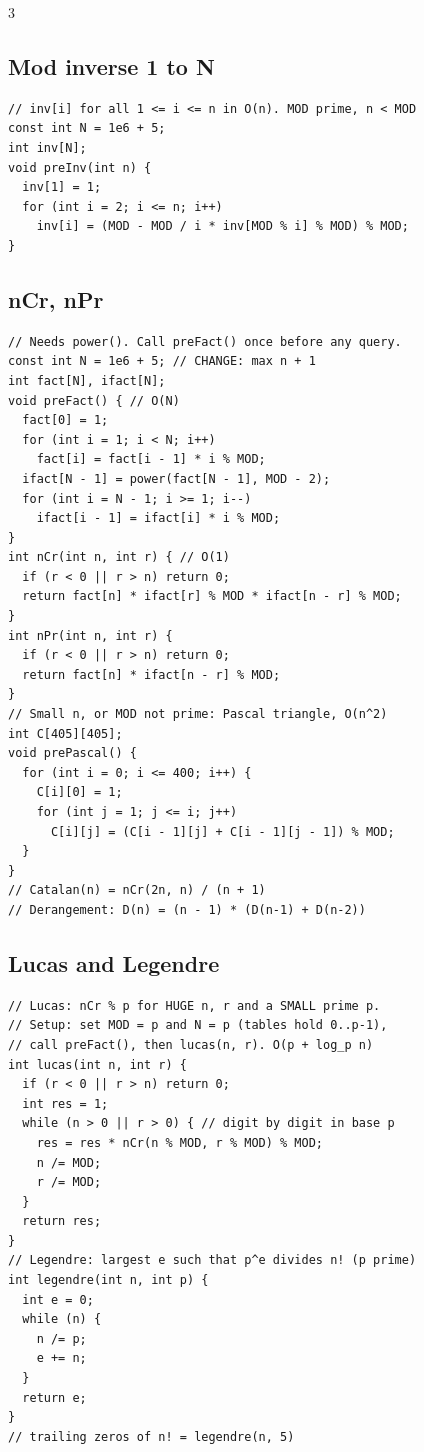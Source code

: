 \documentclass[8pt, a4paper]{article}
\begin{document}
\begin{multicols*}{3}
\subsection{Mod inverse 1 to N}
\begin{lstlisting}
// inv[i] for all 1 <= i <= n in O(n). MOD prime, n < MOD
const int N = 1e6 + 5;
int inv[N];
void preInv(int n) {
  inv[1] = 1;
  for (int i = 2; i <= n; i++)
    inv[i] = (MOD - MOD / i * inv[MOD % i] % MOD) % MOD;
}
\end{lstlisting}
\subsection{nCr, nPr}
\begin{lstlisting}
// Needs power(). Call preFact() once before any query.
const int N = 1e6 + 5; // CHANGE: max n + 1
int fact[N], ifact[N];
void preFact() { // O(N)
  fact[0] = 1;
  for (int i = 1; i < N; i++)
    fact[i] = fact[i - 1] * i % MOD;
  ifact[N - 1] = power(fact[N - 1], MOD - 2);
  for (int i = N - 1; i >= 1; i--)
    ifact[i - 1] = ifact[i] * i % MOD;
}
int nCr(int n, int r) { // O(1)
  if (r < 0 || r > n) return 0;
  return fact[n] * ifact[r] % MOD * ifact[n - r] % MOD;
}
int nPr(int n, int r) {
  if (r < 0 || r > n) return 0;
  return fact[n] * ifact[n - r] % MOD;
}
// Small n, or MOD not prime: Pascal triangle, O(n^2)
int C[405][405];
void prePascal() {
  for (int i = 0; i <= 400; i++) {
    C[i][0] = 1;
    for (int j = 1; j <= i; j++)
      C[i][j] = (C[i - 1][j] + C[i - 1][j - 1]) % MOD;
  }
}
// Catalan(n) = nCr(2n, n) / (n + 1)
// Derangement: D(n) = (n - 1) * (D(n-1) + D(n-2))
\end{lstlisting}
\subsection{Lucas and Legendre}
\begin{lstlisting}
// Lucas: nCr % p for HUGE n, r and a SMALL prime p.
// Setup: set MOD = p and N = p (tables hold 0..p-1),
// call preFact(), then lucas(n, r). O(p + log_p n)
int lucas(int n, int r) {
  if (r < 0 || r > n) return 0;
  int res = 1;
  while (n > 0 || r > 0) { // digit by digit in base p
    res = res * nCr(n % MOD, r % MOD) % MOD;
    n /= MOD;
    r /= MOD;
  }
  return res;
}
// Legendre: largest e such that p^e divides n! (p prime)
int legendre(int n, int p) {
  int e = 0;
  while (n) {
    n /= p;
    e += n;
  }
  return e;
}
// trailing zeros of n! = legendre(n, 5)
\end{lstlisting}

\end{multicols*}
\end{document}
